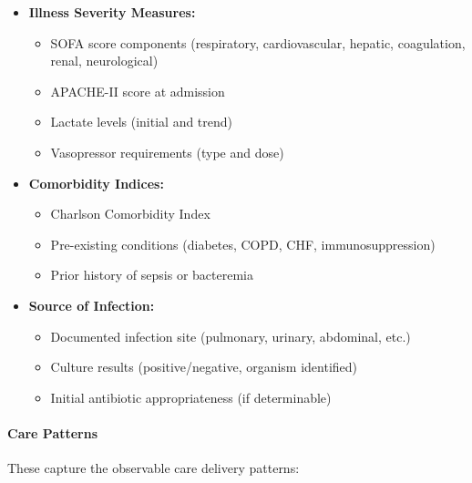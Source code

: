 \documentclass[12pt]{article}
\begin{document}
\begin{itemize}
    \item \textbf{Illness Severity Measures:}
    \begin{itemize}
        \item SOFA score components (respiratory, cardiovascular, hepatic, coagulation, renal, neurological)
        \item APACHE-II score at admission
        \item Lactate levels (initial and trend)
        \item Vasopressor requirements (type and dose)
    \end{itemize}
    \item \textbf{Comorbidity Indices:}
    \begin{itemize}
        \item Charlson Comorbidity Index
        \item Pre-existing conditions (diabetes, COPD, CHF, immunosuppression)
        \item Prior history of sepsis or bacteremia
    \end{itemize}
    \item \textbf{Source of Infection:}
    \begin{itemize}
        \item Documented infection site (pulmonary, urinary, abdominal, etc.)
        \item Culture results (positive/negative, organism identified)
        \item Initial antibiotic appropriateness (if determinable)
    \end{itemize}
\end{itemize}

\paragraph{Care Patterns} These capture the observable care delivery patterns:
\end{document}
